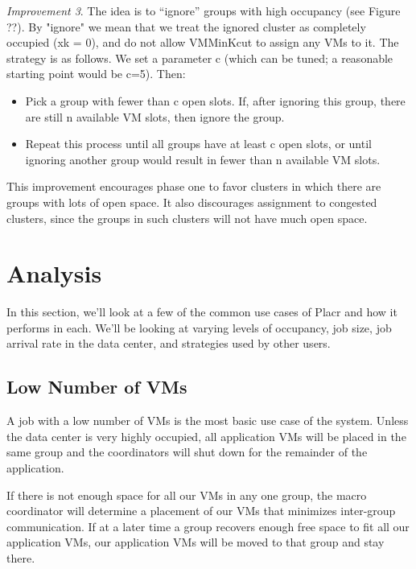 \documentclass[11pt]{article}
\begin{document}
\textit{Improvement 3}. The idea is to “ignore” groups with high occupancy (see Figure ??).  By "ignore" we mean that we treat the ignored cluster as completely occupied (xk = 0), and do not allow VMMinKcut to assign any VMs to it.  The strategy is as follows.  We set a parameter c (which can be tuned; a reasonable starting point would be c=5).  Then:
\vspace{-4mm}
\begin{itemize}
  \item 
Pick a group with fewer than c open slots.  If, after ignoring this group, there are still n available VM slots, then ignore the group.
  \item
Repeat this process until all groups have at least c open slots, or until ignoring another group would result in fewer than n available VM slots.
\end{itemize}

This improvement encourages phase one to favor clusters in which there are groups with lots of open space.  It also discourages assignment to congested clusters, since the groups in such clusters will not have much open space.





\FloatBarrier
\section{Analysis}

In this section, we’ll look at a few of the common use cases of Placr and how it performs in each.  We’ll be looking at varying levels of occupancy, job size, job arrival rate in the data center, and strategies used by other users.

\subsection{Low Number of VMs}

A job with a low number of VMs is the most basic use case of the system.  Unless the data center is very highly occupied, all application VMs will be placed in the same group and the coordinators will shut down for the remainder of the application.

If there is not enough space for all our VMs in any one group, the macro coordinator will determine a placement of our VMs that minimizes inter-group communication.  If at a later time a group recovers enough free space to fit all our application VMs, our application VMs will be moved to that group and stay there.
\end{document}
